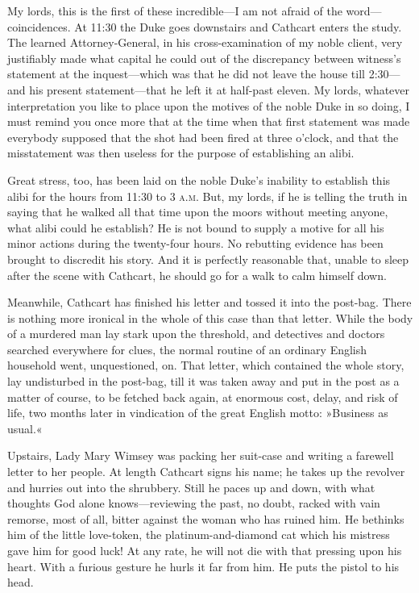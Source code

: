 \begin{dialogue}
\smallskip 

My lords, this is the first of these incredible\allowbreak---\allowbreak I am not afraid of the word\allowbreak---\allowbreak coincidences. At 11:30 the Duke goes downstairs and Cathcart enters the study. The learned Attorney-General, in his cross-examination of my noble client, very justifiably made what capital he could out of the discrepancy between witness's statement at the inquest\allowbreak---\allowbreak which was that he did not leave the house till 2:30\allowbreak---\allowbreak and his present statement\allowbreak---\allowbreak that he left it at half-past eleven. My lords, whatever interpretation you like to place upon the motives of the noble Duke in so doing, I must remind you once more that at the time when that first statement was made everybody supposed that the shot had been fired at three o'clock, and that the misstatement was then useless for the purpose of establishing an alibi.

\smallskip

Great stress, too, has been laid on the noble Duke's inability to establish this alibi for the hours from 11:30 to 3 \textsc{a.m.} But, my lords, if he is telling the truth in saying that he walked all that time upon the moors without meeting anyone, what alibi could he establish? He is not bound to supply a motive for all his minor actions during the twenty-four hours. No rebutting evidence has been brought to discredit his story. And it is perfectly reasonable that, unable to sleep after the scene with Cathcart, he should go for a walk to calm himself down.

\smallskip

Meanwhile, Cathcart has finished his letter and tossed it into the post-bag. There is nothing more ironical in the whole of this case than that letter. While the body of a murdered man lay stark upon the threshold, and detectives and doctors searched everywhere for clues, the normal routine of an ordinary English household went, unquestioned, on. That letter, which contained the whole story, lay undisturbed in the post-bag, till it was taken away and put in the post as a matter of course, to be fetched back again, at enormous cost, delay, and risk of life, two months later in vindication of the great English motto: »Business as usual.«

\smallskip

Upstairs, Lady Mary Wimsey was packing her suit-case and writing a farewell letter to her people. At length Cathcart signs his name; he takes up the revolver and hurries out into the shrubbery. Still he paces up and down, with what thoughts God alone knows\allowbreak---\allowbreak reviewing the past, no doubt, racked with vain remorse, most of all, bitter against the woman who has ruined him. He bethinks him of the little love-token, the platinum-and-diamond cat which his mistress gave him for good luck! At any rate, he will not die with that pressing upon his heart. With a furious gesture he hurls it far from him. He puts the pistol to his head.


\end{dialogue}
